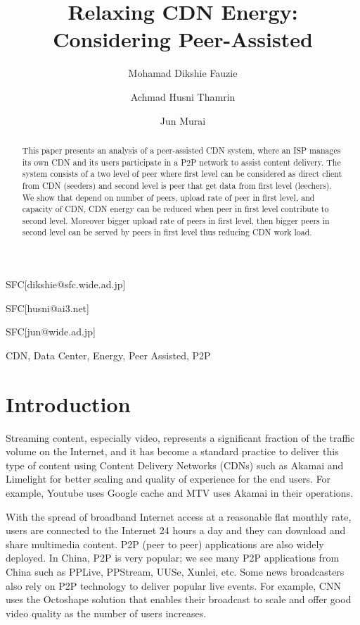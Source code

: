\documentclass[JIP]{ipsj}
\begin{document}
\title{Relaxing CDN Energy: Considering Peer-Assisted}


\author{Mohamad Dikshie Fauzie}{SFC}[dikshie@sfc.wide.ad.jp]
\author{Achmad Husni Thamrin}{SFC}[husni@ai3.net]
\author{Jun Murai}{SFC}[jun@wide.ad.jp]


\begin{abstract}

This paper presents an analysis of a peer-assisted CDN system, where an ISP manages its own CDN and its users participate in a P2P network to assist content delivery.
The system consists of a two level of peer where first level can be considered as direct client from CDN (seeders) and second level is peer that get data from first level (leechers).
We show that depend on number of peers, upload rate of peer in first level, and capacity of CDN, CDN energy can be reduced when peer in first level contribute to second level.
Moreover bigger upload rate of peers in first level, then bigger peers in second level can be served by peers in first level thus reducing CDN work load. 


\end{abstract}

\begin{keyword}
CDN, Data Center, Energy, Peer Assisted, P2P
\end{keyword}

\maketitle

\section{Introduction}\label{intro}
Streaming content, especially video, represents a significant fraction of the traffic volume on the Internet, and it has become a standard practice to deliver this type of content using Content Delivery Networks (CDNs) such as Akamai and Limelight for better scaling and quality of experience for the end users.  
For example, Youtube uses Google cache and MTV uses Akamai in their operations.

With the spread of broadband Internet access at a reasonable flat monthly rate, users are connected to the Internet 24 hours a day and they can download and share multimedia content.  
P2P (peer to peer) applications are also widely deployed.  
In China, P2P is very popular; we see many P2P applications from China such as PPLive, PPStream, UUSe, Xunlei, etc.  
Some news broadcasters also rely on P2P technology to deliver popular live events.  
For example, CNN uses the Octoshape solution that enables their broadcast to scale and offer good video quality as the number of users increases.
\end{document}

